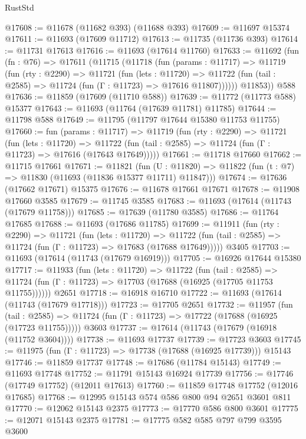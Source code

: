 \begin{lexlean}{RustStd}
\begin{coremodule}
@17608 := @11678 (@11682 @393) (@11688 @393)
@17609 := @11697 @15374
@17611 := @11693 (@17609 @11712)
@17613 := @11735 (@11736 @393)
@17614 := @11731 @17613
@17616 := @11693 (@17614 @11760)
@17633 := @11692
    (fun (fn : @76) =>
    @17611
      (@11715
        (@11718
          (fun (params : @11717) =>
          @11719
            (fun (rty : @2290) =>
            @11721
              (fun (lets : @11720) =>
              @11722 (fun (tail : @2585) => @11724 (fun (Γ : @11723) => @17616 @11807))))))
        @11853))
    @588
@17636 := @11859 (@17609 (@11710 @588))
@17639 := @11772 (@11773 @588) @15377
@17643 := @11693 (@11764 (@17639 @11781) @11785)
@17644 := @11798 @588
@17649 := @11795 (@11797 @17644 @15380 @11753 @11755)
@17660 := fun (params : @11717) =>
  @11719
    (fun (rty : @2290) =>
    @11721
      (fun (lets : @11720) =>
      @11722 (fun (tail : @2585) => @11724 (fun (Γ : @11723) => @17616 (@17643 @17649)))))
@17661 := @11718 @17660
@17662 := @11715 @17661
@17671 := @11821
    (fun (U : @11820) => @11822 (fun (t : @7) => @11830 (@11693 (@11836 @15377 @11711) @11847)))
@17674 := @17636 (@17662 @17671) @15375
@17676 := @11678 @17661 @17671
@17678 := @11908 @17660 @3585
@17679 := @11745 @3585
@17683 := @11693 (@17614 (@11743 (@17679 @11758)))
@17685 := @17639 (@11780 @3585)
@17686 := @11764 @17685
@17688 := @11693 (@17686 @11785)
@17699 := @11911
    (fun (rty : @2290) =>
    @11721
      (fun (lets : @11720) =>
      @11722 (fun (tail : @2585) => @11724 (fun (Γ : @11723) => @17683 (@17688 @17649)))))
    @3405
@17703 := @11693 (@17614 (@11743 (@17679 @16919)))
@17705 := @16926 @17644 @15380
@17717 := @11933
    (fun (lets : @11720) =>
    @11722
      (fun (tail : @2585) =>
      @11724 (fun (Γ : @11723) => @17703 (@17688 (@16925 (@17705 @11753 @11755))))))
    @2651
@17718 := @16918 @16710
@17722 := @11693 (@17614 (@11743 (@17679 @17718)))
@17723 := @17705 @2651
@17732 := @11957
    (fun (tail : @2585) => @11724 (fun (Γ : @11723) => @17722 (@17688 (@16925 (@17723 @11755)))))
    @3603
@17737 := @17614 (@11743 (@17679 (@16918 (@11752 @3604))))
@17738 := @11693 @17737
@17739 := @17723 @3603
@17745 := @11975 (fun (Γ : @11723) => @17738 (@17688 (@16925 @17739))) @15143
@17746 := @11859 @17737
@17748 := @17686 (@11784 @15143)
@17749 := @11693 @17748
@17752 := @11791 @15143 @16924 @17739
@17756 := @17746 (@17749 @17752) (@12011 @17613)
@17760 := @11859 @17748 @17752 (@12016 @17685)
@17768 := @12995 @15143 @574 @586 @800 @94 @2651 @3601 @811
@17770 := @12062 @15143 @2375
@17773 := @17770 @586 @800 @3601
@17775 := @12071 @15143 @2375
@17781 := @17775 @582 @585 @797 @799 @3595 @3600

\end{coremodule}
\end{lexlean}
